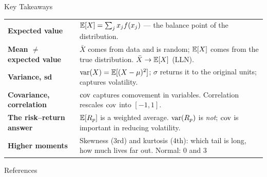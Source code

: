 \documentclass[9pt,english,aspectratio=169]{beamer}
\begin{document}
\begin{frame}{Key Takeaways}

  \vspace{0.6em}
  \begin{tabular}{@{} l p{9.6cm} @{}}
    \textbf{Expected value} & $\mathbb{E}[X] = \sum_j x_j f(x_j)$ --- the balance point
      of the distribution.  \\[0.6em]
    \textbf{Mean $\neq$ expected value} & $\bar{X}$ comes from data and is
      random; $\mathbb{E}[X]$ comes from the true distribution.
      $\bar{X} \to \mathbb{E}[X]$ (LLN). \\[0.6em]
    \textbf{Variance, sd} & $\operatorname{var}(X) = \mathbb{E}[(X-\mu)^2]$; $\sigma$ returns it to
      the original units; captures volatility. \\[0.6em]
    \textbf{Covariance, correlation} & $\operatorname{cov}$ captures comovement in variables. Correlation rescales $\operatorname{cov}$ into $[-1, 1]$. \\[0.6em]
    \textbf{The risk--return answer} & $\mathbb{E}[R_p]$ is a weighted average.
      $\operatorname{var}(R_p)$ is \emph{not}; $\operatorname{cov}$ is important in reducing volatility. \\[0.6em]
    \textbf{Higher moments} & Skewness (3rd) and kurtosis (4th): which tail is
      long, how much lives far out. Normal: $0$ and $3$
  \end{tabular}

\end{frame}


\begin{frame}{References}
  \footnotesize
  \nocite{Shiller2024_data}
  
\end{frame}
\end{document}
